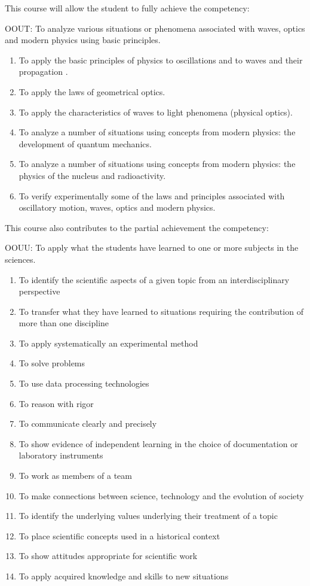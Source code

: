 {This course will allow the student to fully achieve the competency:

OOUT:  To analyze various situations or phenomena associated with waves, optics and modern physics using basic principles.
\begin{enumerate}
\item To apply the basic principles of physics to oscillations and to waves and their propagation .
\item To apply the laws of geometrical optics.
\item To apply the characteristics of waves to light phenomena (physical optics).
\item To analyze a number of situations using concepts from modern physics: the development of quantum mechanics.
\item To analyze a number of situations using concepts from modern physics: the physics of the nucleus and radioactivity.
\item To verify experimentally some of the laws and principles associated with oscillatory motion, waves, optics and modern physics.
\end{enumerate}
\smallskip
This course also contributes to the partial achievement the competency:

OOUU:	To apply what the students have learned to one or more subjects in the sciences.
\begin{enumerate}
\item To identify the scientific aspects of a given topic from an interdisciplinary perspective
\item To transfer what they have learned to situations requiring the contribution of more than one discipline
\item To apply systematically an experimental method
\item To solve problems
\item To use data processing technologies	
\item To reason with rigor
\item To communicate clearly and precisely
\item To show evidence of independent learning in the choice of documentation or laboratory instruments
\item To work as members of a team
\item To make connections between science, technology and the evolution of society
\item To identify the underlying values underlying their treatment of a topic
\item To place scientific concepts used in a historical context
\item To show attitudes appropriate for scientific work 
\item To apply acquired knowledge and skills to new situations
\end{enumerate}
}